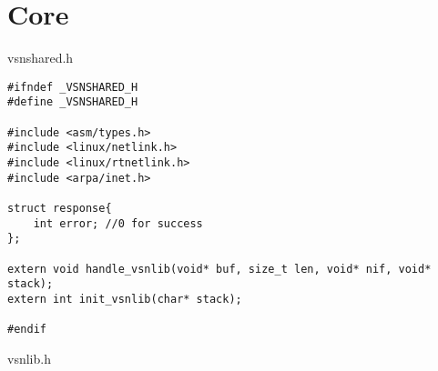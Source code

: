 
\renewcommand{\chaptermark}[1]{\markright{\thechapter \ #1}{}}
\lhead[\fancyplain{}{\bfseries\thepage}]{\fancyplain{}{\bfseries\rightmark}}
\appendix                               %
\chapter{Core}               %
\label{code:AppA}
vsnshared.h
\begin{lstlisting}[style=CscriptStyle]
#ifndef _VSNSHARED_H
#define _VSNSHARED_H

#include <asm/types.h>
#include <linux/netlink.h>
#include <linux/rtnetlink.h>
#include <arpa/inet.h>

struct response{
	int error; //0 for success
};

extern void handle_vsnlib(void* buf, size_t len, void* nif, void* stack);
extern int init_vsnlib(char* stack);

#endif

\end{lstlisting}
vsnlib.h
